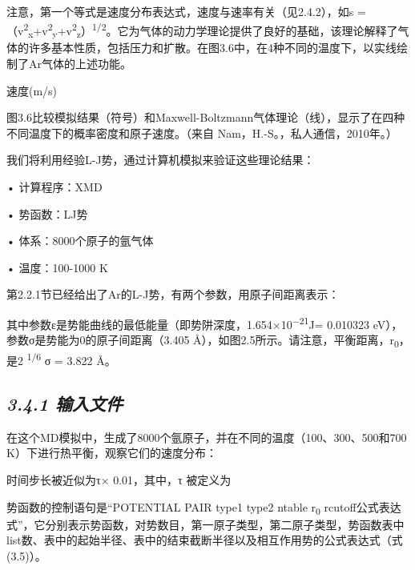 注意，第一个等式是速度分布表达式，速度与速率有关（见2.4.2），如s
=（v\textsuperscript{2}\textsubscript{x}+v\textsuperscript{2}\textsubscript{y}+v\textsuperscript{2}\textsubscript{z}）\textsuperscript{1/2}。它为气体的动力学理论提供了良好的基础，该理论解释了气体的许多基本性质，包括压力和扩散。在图3.6中，在4种不同的温度下，以实线绘制了Ar气体的上述功能。


速度(m/s)

图3.6比较模拟结果（符号）和Maxwell-Boltzmann气体理论（线），显示了在四种不同温度下的概率密度和原子速度。（来自
Nam，H.-S。，私人通信，2010年。）

我们将利用经验L-J势，通过计算机模拟来验证这些理论结果：

• 计算程序：XMD

• 势函数：LJ势

• 体系：8000个原子的氩气体

• 温度：100-1000 K

第2.2.1节已经给出了Ar的L-J势，有两个参数，用原子间距离表示：


其中参数ε是势能曲线的最低能量（即势阱深度，1.654×10\textsuperscript{−21}J=
0.010323 eV），参数σ是势能为0的原子间距离（3.405
Å），如图2.5所示。请注意，平衡距离，r\textsubscript{0}，是2
\textsuperscript{1/6} σ = 3.822 Å。

\hypertarget{ux8f93ux5165ux6587ux4ef6-2}{%
\subsection{\texorpdfstring{\emph{3.4.1
输入文件}}{3.4.1 输入文件}}\label{ux8f93ux5165ux6587ux4ef6-2}}

在这个MD模拟中，生成了8000个氩原子，并在不同的温度（100、300、500和700
K）下进行热平衡，观察它们的速度分布：



时间步长被近似为τ× 0.01，其中，τ 被定义为


势函数的控制语句是``POTENTIAL PAIR type1 type2 ntable r\textsubscript{0}
rcutoff公式表达式''，它分别表示势函数，对势数目，第一原子类型，第二原子类型，势函数表中list数、表中的起始半径、表中的结束截断半径以及相互作用势的公式表达式（式(3.5)）。

